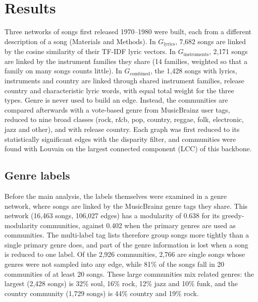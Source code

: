 %
%
\newcommand{\Glyr}{\ensuremath{G_{\mathrm{lyrics}}}}
\newcommand{\Ginst}{\ensuremath{G_{\mathrm{instruments}}}}
\newcommand{\Gcomb}{\ensuremath{G_{\mathrm{combined}}}}


\section*{Results}

Three networks of songs first released 1970--1980 were built, each from a different description of a song (Materials and Methods). In \Glyr, 7,682 songs are linked by the cosine similarity of their TF-IDF lyric vectors. In \Ginst, 2,171 songs are linked by the instrument families they share (14 families, weighted so that a family on many songs counts little). In \Gcomb, the 1,428 songs with lyrics, instruments and country are linked through shared instrument families, release country and characteristic lyric words, with equal total weight for the three types. Genre is never used to build an edge. Instead, the communities are compared afterwards with a vote-based genre from MusicBrainz user tags, reduced to nine broad classes (rock, r\&b, pop, country, reggae, folk, electronic, jazz and other), and with release country. Each graph was first reduced to its statistically significant edges with the disparity filter, and communities were found with Louvain on the largest connected component (LCC) of this backbone.

\subsection*{Genre labels}
Before the main analysis, the labels themselves were examined in a genre network, where songs are linked by the MusicBrainz genre tags they share. This network (16,463 songs, 106,027 edges) has a modularity of 0.638 for its greedy-modularity communities, against 0.402 when the primary genres are used as communities. The multi-label tag lists therefore group songs more tightly than a single primary genre does, and part of the genre information is lost when a song is reduced to one label. Of the 2,926 communities, 2,766 are single songs whose genres were not sampled into any edge, while 81\% of the songs fall in 20 communities of at least 20 songs. These large communities mix related genres: the largest (2,428 songs) is 32\% soul, 16\% rock, 12\% jazz and 10\% funk, and the country community (1,729 songs) is 44\% country and 19\% rock.

